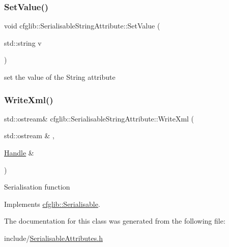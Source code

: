 \subsubsection{\texorpdfstring{Set\+Value()}{SetValue()}}
{\footnotesize\ttfamily void cfglib\+::\+Serialisable\+String\+Attribute\+::\+Set\+Value (\begin{DoxyParamCaption}\item[{std\+::string}]{v }\end{DoxyParamCaption})\hspace{0.3cm}{\ttfamily [inline]}}

set the value of the String attribute \mbox{\label{classcfglib_1_1SerialisableStringAttribute_a25ca4cd51b9acd75e7c75640028e2310}} 
\subsubsection{\texorpdfstring{Write\+Xml()}{WriteXml()}}
{\footnotesize\ttfamily std\+::ostream\& cfglib\+::\+Serialisable\+String\+Attribute\+::\+Write\+Xml (\begin{DoxyParamCaption}\item[{std\+::ostream \&}]{,  }\item[{\hyperlink{classcfglib_1_1Handle}{Handle} \&}]{ }\end{DoxyParamCaption})\hspace{0.3cm}{\ttfamily [virtual]}}

Serialisation function 

Implements \hyperlink{classcfglib_1_1Serialisable_aaeb80cc7397ad312e5ae34f39412ce42}{cfglib\+::\+Serialisable}.



The documentation for this class was generated from the following file\+:\begin{DoxyCompactItemize}
\item 
include/\hyperlink{SerialisableAttributes_8h}{Serialisable\+Attributes.\+h}\end{DoxyCompactItemize}
